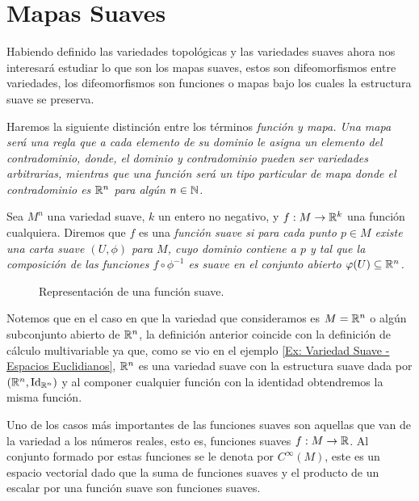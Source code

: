\section{Mapas Suaves}\label{Sección: Mapas Suaves}
Habiendo definido las variedades topológicas y las variedades suaves ahora nos interesará estudiar lo que son los mapas suaves, estos son difeomorfismos entre variedades, los difeomorfismos son funciones o mapas bajo los cuales la estructura suave se preserva.

Haremos la siguiente distinción entre los términos \it{función} y \it{mapa}. Una mapa será una regla que a cada elemento de su dominio le asigna un elemento del contradominio, donde, el dominio y contradominio pueden ser variedades arbitrarias, mientras que una función será un tipo particular de mapa donde el contradominio es $\mathbb{R}^n$ para algún $n \in \mathbb{N}$.

\begin{definition}\label{Definición: Función Suave}
	Sea $M^n$ una variedad suave, $k$ un entero no negativo, y $f: M \to \mathbb{R}^{k}$ una función cualquiera. Diremos que $f$ es una \it{función suave} si para cada punto $p \in M$ existe una carta suave $(U,\phi)$ para $M$, cuyo dominio contiene a $p$ y tal que la composición de las funciones $f \circ \phi^{-1}$ es suave en el conjunto abierto $\varphi(U) \subseteq \mathbb{R}^{n}$.
\end{definition}

\begin{figure}[h]
	\centering
	
	\caption{Representación de una función suave.}
\end{figure}

Notemos que en el caso en que la variedad que consideramos es $M = \mathbb{R}^n$ o algún subconjunto abierto de $\mathbb{R}^n$, la definición anterior coincide con la definición de cálculo multivariable ya que, como se vio en el ejemplo \ref{Ex: Variedad Suave - Espacios Euclidianos}, $\mathbb{R}^n$ es una variedad suave con la estructura suave dada por $(\mathbb{R}^n,\mathrm{Id}_{\mathbb{R}^n})$ y al componer cualquier función con la identidad obtendremos la misma función.

Uno de los casos más importantes de las funciones suaves son aquellas que van de la variedad a los números reales, esto es, funciones suaves $f: M \to \mathbb{R}$. Al conjunto formado por estas funciones se le denota por $C^{\infty}(M)$, este es un espacio vectorial dado que la suma de funciones suaves y el producto de un escalar por una función suave son funciones suaves.

